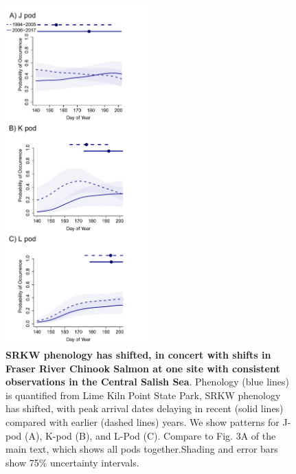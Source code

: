 \documentclass{article}
\begin{document}
\newpage
\begin{figure}[!hp]
\includegraphics[width=0.5\textwidth]{../analyses/orcaphen/figures/orcachinphenoverlap_allpods2006.pdf}
\caption{\textbf{SRKW phenology has shifted, in concert with shifts in Fraser River Chinook Salmon at one site with consistent observations in the Central Salish Sea}. Phenology (blue lines) is quantified from Lime Kiln Point State Park, SRKW phenology has shifted, with peak arrival dates delaying in recent (solid lines) compared with earlier (dashed lines) years. We show patterns for J-pod (A), K-pod (B), and L-Pod (C). Compare to Fig. 3A of the main text, which shows all pods together.Shading and error bars show 75\% uncertainty intervals. }
\label{fig:KLchin}
\end{figure}
\end{document}
